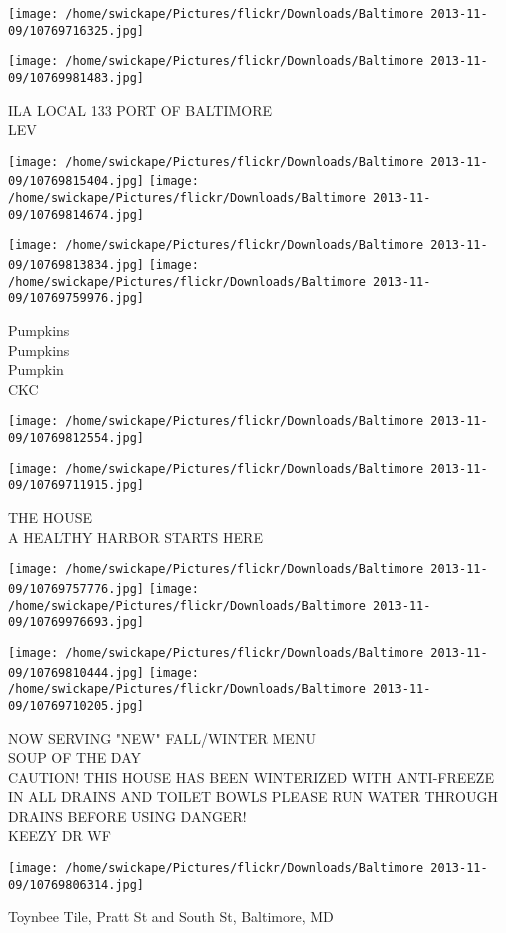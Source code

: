 \documentclass[10pt,letterpaper]{article}
\begin{document}
\texttt{[image: /home/swickape/Pictures/flickr/Downloads/Baltimore 2013-11-09/10769716325.jpg]}

\vspace{0.25in}
\texttt{[image: /home/swickape/Pictures/flickr/Downloads/Baltimore 2013-11-09/10769981483.jpg]}

ILA LOCAL 133 PORT OF BALTIMORE\\
LEV\\
\pagebreak

\texttt{[image: /home/swickape/Pictures/flickr/Downloads/Baltimore 2013-11-09/10769815404.jpg]}
\texttt{[image: /home/swickape/Pictures/flickr/Downloads/Baltimore 2013-11-09/10769814674.jpg]}

\texttt{[image: /home/swickape/Pictures/flickr/Downloads/Baltimore 2013-11-09/10769813834.jpg]}
\texttt{[image: /home/swickape/Pictures/flickr/Downloads/Baltimore 2013-11-09/10769759976.jpg]}

Pumpkins\\
Pumpkins\\
Pumpkin\\
CKC\\
\pagebreak

\texttt{[image: /home/swickape/Pictures/flickr/Downloads/Baltimore 2013-11-09/10769812554.jpg]}

\vspace{0.25in}
\texttt{[image: /home/swickape/Pictures/flickr/Downloads/Baltimore 2013-11-09/10769711915.jpg]}

THE HOUSE\\
A HEALTHY HARBOR STARTS HERE\\
\pagebreak

\texttt{[image: /home/swickape/Pictures/flickr/Downloads/Baltimore 2013-11-09/10769757776.jpg]}
\texttt{[image: /home/swickape/Pictures/flickr/Downloads/Baltimore 2013-11-09/10769976693.jpg]}

\texttt{[image: /home/swickape/Pictures/flickr/Downloads/Baltimore 2013-11-09/10769810444.jpg]}
\texttt{[image: /home/swickape/Pictures/flickr/Downloads/Baltimore 2013-11-09/10769710205.jpg]}

NOW SERVING "NEW" FALL/WINTER MENU\\
SOUP OF THE DAY\\
CAUTION! THIS HOUSE HAS BEEN WINTERIZED WITH ANTI{-}FREEZE IN ALL DRAINS AND TOILET BOWLS PLEASE RUN WATER THROUGH DRAINS BEFORE USING DANGER!\\
KEEZY DR WF\\
\pagebreak

\texttt{[image: /home/swickape/Pictures/flickr/Downloads/Baltimore 2013-11-09/10769806314.jpg]}

Toynbee Tile, Pratt St and South St, Baltimore, MD\\
\pagebreak
\end{document}

